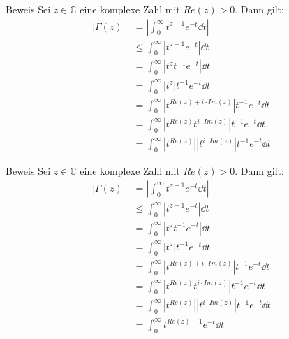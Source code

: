 \documentclass[10pt]{beamer}
\def\bC{\mathbb{C}}
\begin{document}
\begin{frame}{Beweis}
    Sei \( z \in \bC \) eine komplexe Zahl mit \( Re(z) > 0 \). Dann gilt:
    \begin{align*}
        \left\vert \Gamma( z ) \right\vert
        & = \left\vert \int_{0}^{\infty} t^{z - 1} e^{-t} \dd{t} \right\vert \\
        & \leq \int_{0}^{\infty} \left\vert t^{z - 1} e^{-t} \right\vert \dd{t} \\
        & = \int_{0}^{\infty} \left\vert t^{z}t^{-1} e^{-t} \right\vert \dd{t} \\
        & = \int_{0}^{\infty} \left\vert t^{z} \right\vert t^{-1} e^{-t} \dd{t} \\
        & = \int_{0}^{\infty} \left\vert t^{Re(z) + i \cdot Im(z)} \right\vert t^{-1} e^{-t} \dd{t} \\
        & = \int_{0}^{\infty} \left\vert t^{Re(z)} t^{i \cdot Im(z)} \right\vert t^{-1} e^{-t} \dd{t} \\
        & = \int_{0}^{\infty} \left\vert t^{Re(z)} \right\vert \left\vert t^{i \cdot Im(z)} \right\vert t^{-1} e^{-t} \dd{t}
    \end{align*}
\end{frame}



\begin{frame}{Beweis}
    Sei \( z \in \bC \) eine komplexe Zahl mit \( Re(z) > 0 \). Dann gilt:
    \begin{align*}
        \left\vert \Gamma( z ) \right\vert
        & = \left\vert \int_{0}^{\infty} t^{z - 1} e^{-t} \dd{t} \right\vert \\
        & \leq \int_{0}^{\infty} \left\vert t^{z - 1} e^{-t} \right\vert \dd{t} \\
        & = \int_{0}^{\infty} \left\vert t^{z}t^{-1} e^{-t} \right\vert \dd{t} \\
        & = \int_{0}^{\infty} \left\vert t^{z} \right\vert t^{-1} e^{-t} \dd{t} \\
        & = \int_{0}^{\infty} \left\vert t^{Re(z) + i \cdot Im(z)} \right\vert t^{-1} e^{-t} \dd{t} \\
        & = \int_{0}^{\infty} \left\vert t^{Re(z)} t^{i \cdot Im(z)} \right\vert t^{-1} e^{-t} \dd{t} \\
        & = \int_{0}^{\infty} \left\vert t^{Re(z)} \right\vert \left\vert t^{i \cdot Im(z)} \right\vert t^{-1} e^{-t} \dd{t} \\
        & = \int_{0}^{\infty} t^{Re(z) - 1} e^{-t} \dd{t}
    \end{align*}
\end{frame}
\end{document}
